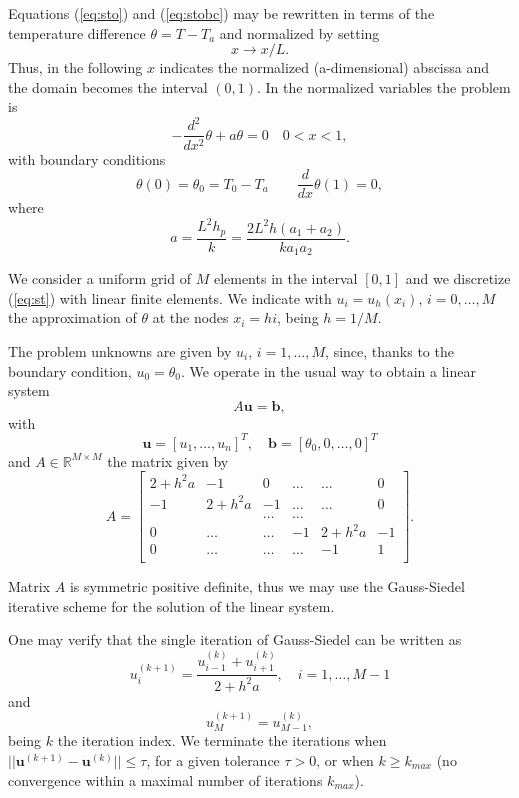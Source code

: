\documentclass{article}
\begin{document}
Equations (\ref{eq:sto}) and (\ref{eq:stobc}) may be rewritten in terms of the 
temperature difference  $\theta=T-T_a$ and normalized by setting
\[
x \rightarrow x/L.
\]
Thus, in the following $x$ indicates the normalized (a-dimensional) abscissa and the domain becomes
the interval $(0,1)$. In the normalized variables the problem is
\begin{equation}
\label{eq:st}
-\frac{d^2}{dx^2}\theta +a\theta =0\quad 0<x<1,
\end{equation}
with boundary conditions
\begin{equation}
\label{eq:stbc}
\theta(0)=\theta_0=T_0-T_a\qquad \frac{d}{dx}\theta(1)=0,
\end{equation}
where
\[
a=\frac{L^2h_p}{k}=\frac{2L^2 h(a_1+a_2)}{ka_1a_2}.
\]

We consider a uniform grid of  $M$ elements in the interval 
$[0,1]$ and we discretize  (\ref{eq:st}) with linear finite elements.
We indicate with  $u_i=u_h(x_i)$, $i=0,\ldots,M$ the approximation of
$\theta$ at the nodes $x_i=h i$, being $h=1/M$.

The problem unknowns are given by $u_i$, $i=1,\ldots,M$, since, thanks to the boundary condition, 
$u_0=\theta_0$.  We operate  in the usual way to obtain a linear system
\begin{equation}
\label{eq:stfem}
A\mathbf{u}=\mathbf{b},
\end{equation}
with 
\[
\mathbf{u}=[u_1,\ldots,u_n]^T,\quad \mathbf{b}=[\theta_0,0,\ldots,0]^T
\]
and $A\in \mathbb{R}^{M\times M}$ the matrix given by
\[
A=\left[
\begin{array}{llllll}
2+h^2a & -1 & 0 &\ldots&\ldots& 0\\
-1 & 2+h^2a & -1 &\ldots&\ldots& 0\\
 &   & \ldots &\ldots& & \\
0  & \ldots & \ldots &-1 &2+h^2a& -1\\
0  & \ldots & \ldots &\ldots&-1& 1\\
\end{array}
\right].
\]

Matrix $A$ is symmetric positive definite, thus we may use the 
Gauss-Siedel iterative scheme for the solution of the linear system.

One may verify that the single iteration of Gauss-Siedel can be written as 
\[
u_i^{(k+1)}=\frac{u^{(k)}_{i-1}+u^{(k)}_{i+1}}{2+h^2a},\quad i=1,\ldots,M-1
\]
and
\[
u_M^{(k+1)}=u^{(k)}_{M-1},
\]
being $k$ the iteration index. We terminate the iterations when 
$||\mathbf{u}^{(k+1)}-\mathbf{u}^{(k)}||\le \tau$, for a given tolerance
$\tau>0$, or when  $k\ge k_{max}$ (no convergence within a maximal number of iterations $ k_{max}$).
\end{document}
